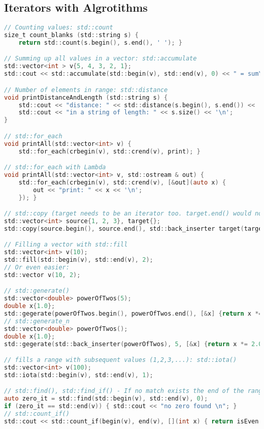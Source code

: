 \subsection{Iterators with Algrotithms}
\begin{lstlisting}[style=frame, style= linenumbers, language=C]
// Counting values: std::count
size_t count_blanks (std::string s) {
    return std::count(s.begin(), s.end(), ' '); }

// Summing up all values in a vector: std::accumulate
std::vector<int > v{5, 4, 3, 2, 1};
std::cout << std::accumulate(std::begin(v), std::end(v), 0) << " = sum\n";

// Number of elements in range: std::distance
void printDistanceAndLength (std::string s) {
    std::cout << "distance: " << std::distance(s.begin(), s.end()) << '\n';
    std::cout << "in a string of length: " << s.size() << '\n';
}

// std::for_each
void printAll(std::vector<int> v) {
    std::for_each(crbegin(v), std::crend(v), print); }

// std::for_each with Lambda
void printAll(std::vector<int> v, std::ostream & out) {
    std::for_each(crbegin(v), std::crend(v), [&out](auto x) {
        out << "print: " << x << '\n';
    }); }

// std::copy (target needs to be an iterator too. target.end() would not work)
std::vector<int> source{1, 2, 3}, target{};
std::copy(source.begin(), source.end(), std::back_inserter target(target));

// Filling a vector with std::fill
std::vector<int> v(10);
std::fill(std::begin(v), std::end(v), 2);
// Or even easier:
std::vector v(10, 2);

// std::generate()
std::vector<double> powerOfTwos(5);
double x{1.0};
std::gegerate(powerOfTwos.begin(), powerOfTwos.end(), [&x] {return x *= 2.0; });
// std::generate_n
std::vector<double> powerOfTwos();
double x{1.0};
std::gegerate(std::back_inserter(powerOfTwos), 5, [&x] {return x *= 2.0; });

// fills a range with subsequent values (1,2,3,...): std::iota()
std::vector<int> v(100);
std::iota(std::begin(v), std::end(v), 1);

// std::find(), std::find_if() - If no match exists the end of the range is returned
auto zero_it = std::find(std::begin(v), std::end(v), 0);
if (zero_it == std::end(v)) { std::cout << "no zero found \n"; }
// std::count_if()
std::cout << std::count_if(begin(v), end(v), [](int x) { return isEven(x); }) << " even numbers\n";
\end{lstlisting}

